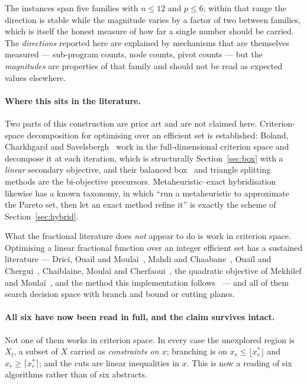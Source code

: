 \documentclass[11pt,a4paper]{article}
\begin{document}
The instances span five families with $n \leqslant 12$ and
$p \leqslant 6$; within that range the direction is stable while the magnitude
varies by a factor of two between families, which is itself the honest measure
of how far a single number should be carried.  The \emph{directions} reported here
are explained by mechanisms that are themselves measured --- sub-program counts,
node counts, pivot counts --- but the \emph{magnitudes} are properties of that
family and should not be read as expected values elsewhere.

\paragraph{Where this sits in the literature.}\label{sec:prior}
Two parts of this construction are prior art and are not claimed here.
Criterion-space decomposition for optimising over an efficient set is
established: Boland, Charkhgard and Savelsbergh~\cite{boland2017} work in the
full-dimensional criterion space and decompose it at each iteration, which is
structurally Section~\ref{sec:box} with a \emph{linear} secondary objective,
and their balanced box~\cite{balancedbox} and triangle
splitting~\cite{trianglesplitting} methods are the bi-objective precursors.
Metaheuristic--exact hybridisation likewise has a known taxonomy, in which
``run a metaheuristic to approximate the Pareto set, then let an exact method
refine it'' is exactly the scheme of Section~\ref{sec:hybrid}.

What the fractional literature does \emph{not} appear to do is work in
criterion space.  Optimising a linear fractional function over an integer
efficient set has a sustained literature --- Drici, Oua\"il and
Moula\"i~\cite{drici2018}, Mahdi and Chaabane~\cite{mahdi2015}, Oua\"il and
Chergui~\cite{ouail2019}, Chaiblaine, Moula\"i and
Cherfaoui~\cite{chaiblaine2020}, the quadratic objective of Mekhilef and
Moula\"i~\cite{moulai2021}, and the method this implementation
follows~\cite{younsiabbaci2025} --- and all of them search decision space
with branch and bound or cutting planes.

\paragraph{All six have now been read in full, and the claim survives
intact.}
Not one of them works in criterion space.  In every case the unexplored
region is $X_l$, a subset of $X$ carried as \emph{constraints on $x$};
branching is on $x_r \leqslant \lfloor x_r^* \rfloor$ and
$x_r \geqslant \lceil x_r^* \rceil$; and the cuts are linear inequalities in
$x$.  This is now a reading of six algorithms rather than of six abstracts.
\end{document}
